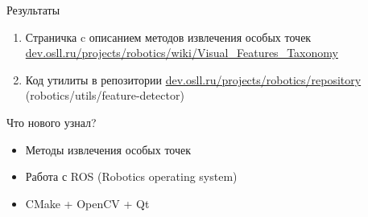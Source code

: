 \begin{frame}{Результаты}
\begin{enumerate}
	\item Страничка c описанием методов извлечения особых точек \url{dev.osll.ru/projects/robotics/wiki/Visual_Features_Taxonomy}
	\item Код утилиты в репозитории \url{dev.osll.ru/projects/robotics/repository} (robotics/utils/feature-detector)
\end{enumerate}
\end{frame}

\begin{frame}{Что нового узнал?}
\begin{itemize}
	\item Методы извлечения особых точек
	\item Работа с ROS (Robotics operating system)
	\item CMake + OpenCV + Qt
\end{itemize}
\end{frame}




